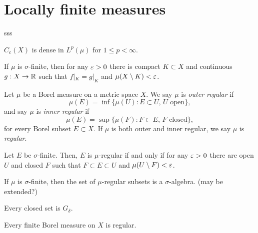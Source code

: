 \documentclass{../../large}
\begin{document}
\section{Locally finite measures}

\begin{prb}
sss
\begin{parts}
\item $C_c(X)$ is dense in $L^p(\mu)$ for $1\le p<\infty$.
\item If $\mu$ is $\sigma$-finite, then for any $\varepsilon>0$ there is compact $K\subset X$ and continuous $g:X\to\mathbb{R}$ such that $f|_K=g|_K$ and $\mu(X\setminus K)<\varepsilon$.
\end{parts}
\end{prb}


\begin{prb}
\begin{parts}
\item
\end{parts}
\end{prb}

\begin{prb}
Let $\mu$ be a Borel measure on a metric space $X$.
We say $\mu$ is \emph{outer regular} if
\[\mu(E)=\inf\{\mu(U):E\subset U,\,U\text{ open}\},\]
and say $\mu$ is \emph{inner regular} if
\[\mu(E)=\sup\{\mu(F):F\subset E,\,F\text{ closed}\},\]
for every Borel subset $E\subset X$.
If $\mu$ is both outer and inner regular, we say $\mu$ is \emph{regular}.
\begin{parts}
\item Let $E$ be $\sigma$-finite. Then, $E$ is $\mu$-regular if and only if for any $\varepsilon>0$ there are open $U$ and closed $F$ such that $F\subset E\subset U$ and $\mu(U\setminus F)<\varepsilon$.
\item If $\mu$ is $\sigma$-finite, then the set of $\mu$-regular subsets is a $\sigma$-algebra. (may be extended?)
\item Every closed set is $G_\delta$.
\item Every finite Borel measure on $X$ is regular.
\end{parts}
\end{prb}
\begin{pf}
\end{pf}
\end{document}
